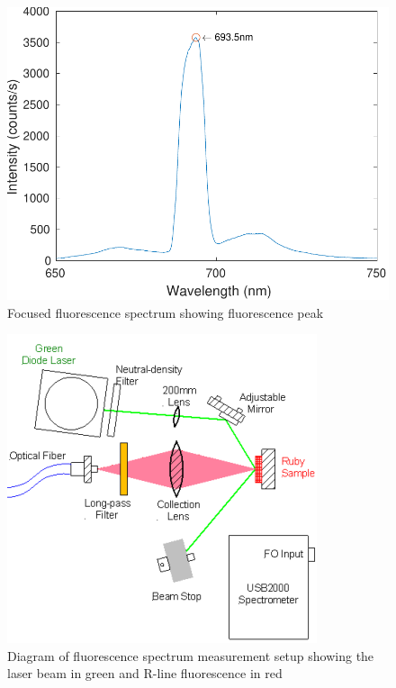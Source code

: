 \documentclass[11pt, a4paper, twocolumn]{article}
\begin{document}
\begin{figure}[H]
\includegraphics[width=\linewidth]{fluorescenceSpectrumFocused.pdf}
\caption{Focused fluorescence spectrum showing fluorescence peak}
\label{fig:intensities}
\end{figure}

\begin{figure}[H]
\includegraphics[width=\linewidth]{laserBenchDiagram.png}
\caption{Diagram of fluorescence spectrum measurement setup showing the laser beam in green and R-line fluorescence in red
}
\label{fig:intensities}
\end{figure}
\end{document}
